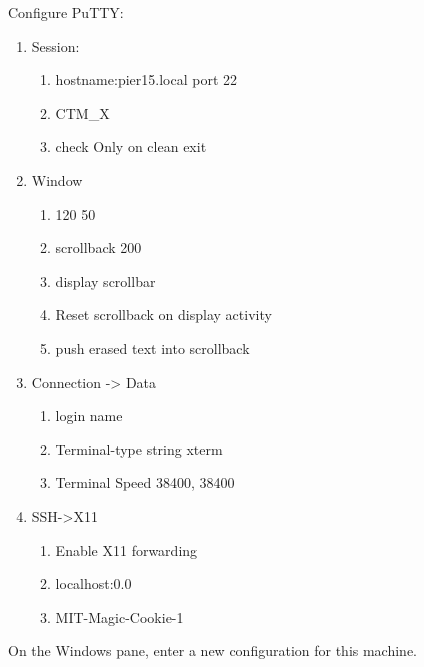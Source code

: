 Configure PuTTY:

\vspace{-.15cm}
\begin{enumerate}\addtolength{\itemsep}{-0.5\baselineskip}
   \item   Session:
\vspace{-.15cm}
\begin{enumerate}\addtolength{\itemsep}{-0.5\baselineskip}
   \item   hostname:pier15.local  port 22
   \item   CTM\_X
   \item   check Only on clean exit
\end{enumerate}
   \item   Window
\vspace{-.15cm}
\begin{enumerate}\addtolength{\itemsep}{-0.5\baselineskip}
   \item   120 50
   \item   scrollback 200
   \item   display scrollbar
   \item   Reset scrollback on display activity
   \item   push erased text into scrollback
\end{enumerate}
   \item   Connection -> Data
\vspace{-.15cm}
\begin{enumerate}\addtolength{\itemsep}{-0.5\baselineskip}
   \item   login name 
   \item   Terminal-type string xterm
   \item   Terminal Speed 38400, 38400
\end{enumerate}
   \item   SSH->X11
\vspace{-.15cm}
\begin{enumerate}\addtolength{\itemsep}{-0.5\baselineskip}
   \item   Enable X11 forwarding
   \item   localhost:0.0
   \item   MIT-Magic-Cookie-1
\end{enumerate}

\end{enumerate}


On the Windows pane, enter a new configuration for this machine.

